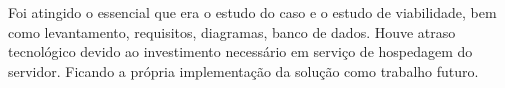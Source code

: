 \documentclass[12pt]{article}
\begin{document}
Foi atingido o essencial que era o estudo do caso e o estudo de viabilidade, bem como levantamento, requisitos, diagramas, banco de dados.
Houve atraso tecnológico devido ao investimento necessário em serviço de hospedagem do servidor. Ficando a própria implementação da solução como trabalho futuro.











\end{document}
